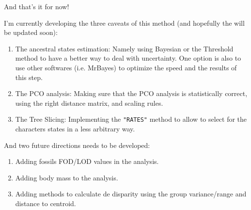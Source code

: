 \documentclass[a4paper,11pt]{article}\usepackage[]{graphicx}\usepackage[]{color}
\begin{document}
And that's it for now!

I'm currently developing the three caveats of this method (and hopefully the will be updated soon):
\begin{enumerate}
\item{The ancestral states estimation:} Namely using Bayesian or the Threshold method to have a better way to deal with uncertainty. One option is also to use other softwares (i.e. MrBayes) to optimize the speed and the results of this step.
\item{The PCO analysis:} Making sure that the PCO analysis is statistically correct, using the right distance matrix, and scaling rules.
\item{The Tree Slicing:} Implementing the \texttt{"RATES"} method to allow to select for the characters states in a less arbitrary way.
\end{enumerate}
And two future directions needs to be developed:
\begin{enumerate}
\item{Adding fossils FOD/LOD values in the analysis.}
\item{Adding body mass to the analysis.}
\item{Adding methods to calculate de disparity using the group variance/range and distance to centroid.}
\end{enumerate}
\end{document}
